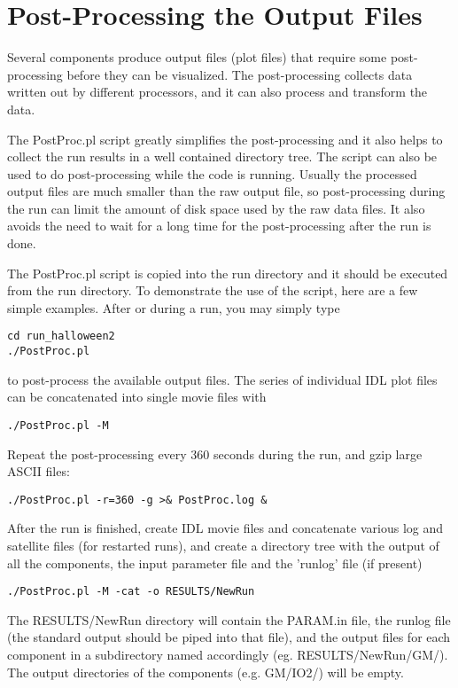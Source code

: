 \section{Post-Processing the Output Files}

Several components produce output files (plot files) that require
some post-processing before they can be visualized. The post-processing
collects data written out by different processors, and it can also
process and transform the data. 

The PostProc.pl script greatly simplifies the post-processing and
it also helps to collect the run results in a well contained directory tree.
The script can also be used to do post-processing while the code is running.
Usually the processed output files are much smaller than the raw output file,
so post-processing during the run can limit the amount of disk space used
by the raw data files. It also avoids the need to wait for a long time 
for the post-processing after the run is done. 

The PostProc.pl script is copied into the run directory and it should
be executed from the run directory.
To demonstrate the use of the script, here are a few simple examples.
After or during a run, you may simply type
\begin{verbatim}
cd run_halloween2
./PostProc.pl
\end{verbatim}
to post-process the available output files. The series of individual 
IDL plot files can be concatenated into single movie files with
\begin{verbatim}
./PostProc.pl -M
\end{verbatim}
Repeat the post-processing every 360 seconds during the run,
and gzip large ASCII files:
\begin{verbatim}
./PostProc.pl -r=360 -g >& PostProc.log &
\end{verbatim}
After the run is finished, create IDL movie files and concatenate
various log and satellite files (for restarted runs),
and create a directory tree with the output
of all the components, the input parameter file and the 'runlog' file
(if present)
\begin{verbatim}
./PostProc.pl -M -cat -o RESULTS/NewRun
\end{verbatim}
The RESULTS/NewRun directory will contain the PARAM.in file, the
runlog file (the standard output should be piped into that file),
and the output files for each component in a subdirectory named
accordingly (eg. RESULTS/NewRun/GM/). The output directories of
the components (e.g. GM/IO2/) will be empty.

